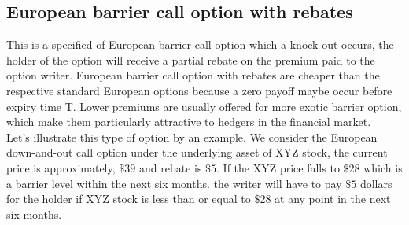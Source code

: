 	\subsection{European barrier call option with rebates}
	This is a specified of European barrier call option which a knock-out occurs, the holder of the option will receive a partial rebate on the premium paid to the option writer. European barrier call option with rebates are cheaper than the respective standard European options because a zero payoff maybe occur before expiry time T. Lower premiums are usually offered for more exotic barrier option, which make them particularly attractive to hedgers in the financial market.\\[0.5cm]
	Let's illustrate this type of option by an example. We consider the European down-and-out call option under the underlying asset of XYZ stock, the current price is approximately, $\$39$ and rebate is $\$5$. If the XYZ price falls to $\$28$ which is a barrier level within the next six months. the writer will have to  pay $\$5$ dollars for the holder if XYZ stock is less than or equal to $\$28$ at any point in the next six months.